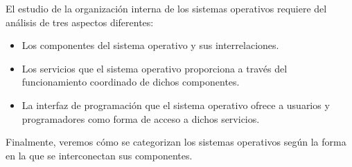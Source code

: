 El estudio de la organización interna de los sistemas operativos
requiere del análisis de tres aspectos diferentes:

\begin{itemize}
\item
  Los componentes del sistema operativo y sus interrelaciones.
\item
  Los servicios que el sistema operativo proporciona a través del
  funcionamiento coordinado de dichos componentes.
\item
  La interfaz de programación que el sistema operativo ofrece a usuarios
  y programadores como forma de acceso a dichos servicios.
\end{itemize}

Finalmente, veremos cómo se categorizan los sistemas operativos según la
forma en la que se interconectan sus componentes.

